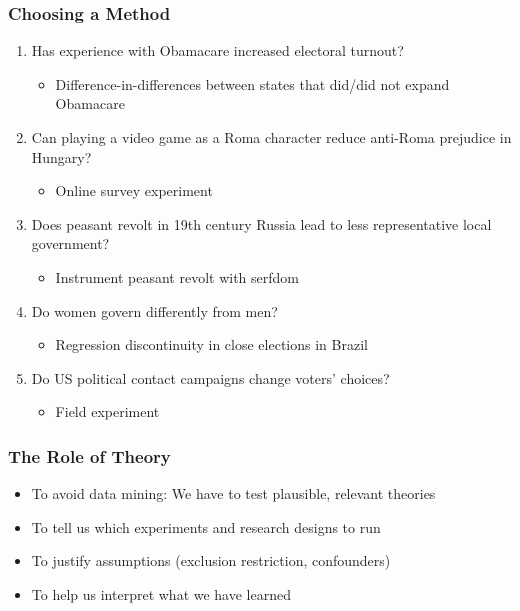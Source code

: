 \documentclass[xcolor=x11names,compress]{beamer}\usepackage[]{graphicx}\usepackage[]{color}
\renewcommand{\(}{\begin{columns}}
\renewcommand{\)}{\end{columns}}
\newcommand{\<}[1]{\begin{column}{#1}}
\renewcommand{\>}{\end{column}}
\begin{document}
\begin{frame}
\frametitle{Choosing a Method}
\begin{enumerate}
\item Has experience with Obamacare increased electoral turnout?
\pause
\begin{itemize}
\item Difference-in-differences between states that did/did not expand Obamacare
\pause
\end{itemize}
\item Can playing a video game as a Roma character reduce anti-Roma prejudice in Hungary?
\pause
\begin{itemize}
\item Online survey experiment
\pause
\end{itemize}
\item Does peasant revolt in 19th century Russia lead to less representative local government?
\pause
\begin{itemize}
\item Instrument peasant revolt with serfdom
\pause
\end{itemize}
\item Do women govern differently from men? 
\pause
\begin{itemize}
\item Regression discontinuity in close elections in Brazil
\pause
\end{itemize}
\item Do US political contact campaigns change voters' choices?
\pause
\begin{itemize}
\item Field experiment
\pause
\end{itemize}
\end{enumerate}
\end{frame}

\begin{frame}
\frametitle{The Role of Theory}
\begin{itemize}
\item To avoid data mining: We have to test plausible, relevant theories
\pause
\item To tell us which experiments and research designs to run
\pause
\item To justify assumptions (exclusion restriction, confounders)
\pause
\item To help us interpret what we have learned
\end{itemize}
\end{frame}
\end{document}
